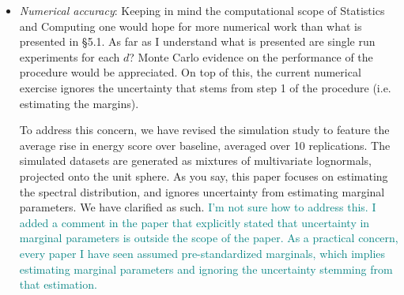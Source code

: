 \documentclass[10pt]{article}
\newcommand{\comment}[1]{\textcolor{teal}{#1}}
\newcommand{\bruno}[1]{\textcolor{red}{#1}}
\begin{document}
\begin{itemize}

    

\item \emph{Numerical accuracy}:  Keeping in mind the computational scope of 
    Statistics and Computing one would hope for more numerical work than what is 
    presented in §5.1. As far as I understand what is presented are single run 
    experiments for each $d$? Monte Carlo evidence on the performance of the 
    procedure would be appreciated. On top of this, the current numerical exercise
    ignores the uncertainty that stems from step 1 of the procedure 
    (i.e. estimating the margins).

To address this concern, we have revised the simulation study to feature the 
    average rise in energy score over baseline, averaged over 10 replications.  
    The simulated datasets are generated as mixtures of multivariate lognormals, 
    projected onto the unit sphere.  As you say, this paper focuses on estimating
    the spectral distribution, and ignores uncertainty from estimating marginal
    parameters.  We have clarified as such.
    \comment{I'm not sure how to address this.  I added a comment in the paper
    that explicitly stated that uncertainty in marginal parameters is outside the
    scope of the paper.  As a practical concern, every paper I have seen assumed
    pre-standardized marginals, which implies estimating marginal parameters and
    ignoring the uncertainty stemming from that estimation.}    


\end{itemize}
\end{document}
